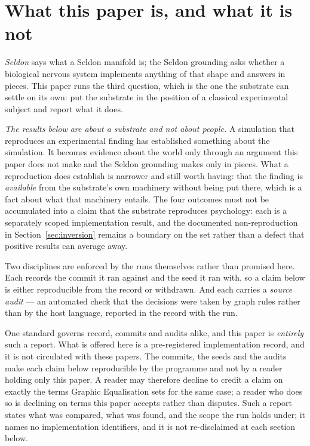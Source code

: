 \documentclass[11pt,a4paper]{article}
\theoremstyle{remark}
\begin{document}
\section{What this paper is, and what it is not}\label{sec:scope}
\emph{Seldon} says what a Seldon manifold is; the Seldon grounding asks whether a biological
nervous system implements anything of that shape and answers in pieces. This paper runs the third
question, which is the one the substrate can settle on its own: put the substrate in the position of
a classical experimental subject and report what it does.

\emph{The results below are about a substrate and not about people.} A simulation that reproduces an
experimental finding has established something about the simulation. It becomes evidence about the
world only through an argument this paper does not make and the Seldon grounding makes only in
pieces. What a reproduction does establish is narrower and still worth having: that the finding is
\emph{available} from the substrate's own machinery without being put there, which is a fact about
what that machinery entails. The four outcomes must not be accumulated into a claim that the
substrate reproduces psychology: each is a separately scoped implementation result, and the documented
non-reproduction in Section~\ref{sec:inversion} remains a boundary on the set rather than a defect
that positive results can average away.

Two disciplines are enforced by the runs themselves rather than promised here. Each records the
commit it ran against and the seed it ran with, so a claim below is either reproducible from the
record or withdrawn. And each carries a \emph{source audit} --- an automated check that the
decisions were taken by graph rules rather than by the host language, reported in the record with
the run.

One standard governs record, commits and audits alike, and this paper is \emph{entirely} such a
report. What is offered here is a pre-registered implementation record, and it is not circulated
with these papers. The commits, the seeds and the audits make each claim below reproducible by the
programme and not by a reader holding only this paper. A reader may therefore decline to credit a
claim on exactly the terms Graphic Equalisation sets for the same case; a reader who does so is
declining on terms this paper accepts rather than disputes. Such a report states what was compared,
what was found, and the scope the run holds under; it names no implementation identifiers, and it
is not re-disclaimed at each section below.
\end{document}
